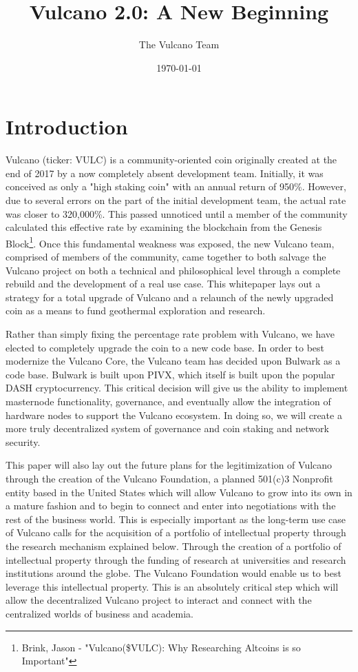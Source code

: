\documentclass[A4paper, 12pt]{article}
\begin{document}
\title{Vulcano 2.0: A New Beginning}
\author{The Vulcano Team}
\date{\today}

\newpage
\tableofcontents
\newpage
\section{Introduction}

Vulcano (ticker: VULC) is a community-oriented coin originally created at the end of 2017 by a now completely absent development team. Initially, it was conceived as only a "high staking coin" with an annual return of 950\%. However, due to several errors on the part of the initial development team, the actual rate was closer to 320,000\%. This passed unnoticed until a member of the community calculated this effective rate by examining the blockchain from the Genesis Block\footnote{Brink, Jason - "Vulcano(\$VULC): Why Researching Altcoins is so Important"}. Once this fundamental weakness was exposed, the new Vulcano team, comprised of members of the community, came together to both salvage the Vulcano project on both a technical and philosophical level through a complete rebuild and the development of a real use case. This whitepaper lays out a strategy for a total upgrade of Vulcano and a relaunch of the newly upgraded coin as a means to fund geothermal exploration and research.

Rather than simply fixing the percentage rate problem with Vulcano, we have elected to completely upgrade the coin to a new code base. In order to best modernize the Vulcano Core, the Vulcano team has decided upon Bulwark as a code base. Bulwark is built upon PIVX, which itself is built upon the popular DASH cryptocurrency. This critical decision will give us the ability to implement masternode functionality, governance, and eventually allow the integration of hardware nodes to support the Vulcano ecosystem. In doing so, we will create a more truly decentralized system of governance and coin staking and network security.

This paper will also lay out the future plans for the legitimization of Vulcano through the creation of the Vulcano Foundation, a planned 501(c)3 Nonprofit entity based in the United States which will allow Vulcano to grow into its own in a mature fashion and to begin to connect and enter into negotiations with the rest of the business world. This is especially important as the long-term use case of Vulcano calls for the acquisition of a portfolio of intellectual property through the research mechanism explained below. Through the creation of a portfolio of intellectual property through the funding of research at universities and research institutions around the globe. The Vulcano Foundation would enable us to best leverage this intellectual property. This is an absolutely critical step which will allow the decentralized Vulcano project to interact and connect with the centralized worlds of business and academia. 
\end{document}
